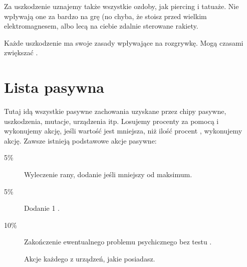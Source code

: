 Za uszkodzenie uznajemy także wszystkie ozdoby, jak piercing i tatuaże.
Nie wpływają one za bardzo na grę (no chyba, że stoisz przed wielkim elektromagnesem, albo lecą na ciebie zdalnie sterowane rakiety.

Każde uszkodzenie ma swoje zasady wpływające na rozgrywkę.
Mogą czasami zwiększać \abnkp{}.

\section{Lista pasywna}
Tutaj idą wszystkie pasywne zachowania uzyskane przez chipy pasywne, uszkodzenia, mutacje, urządzenia itp.
Losujemy procenty za pomocą \dc{} i wykonujemy akcję, jeśli wartość jest mniejsza, niż ilość procent , wykonujemy akcję.
Zawsze istnieją podstawowe akcje pasywne:
\begin{description}
\item[5\%] Wyleczenie rany, dodanie \abzyc{} jeśli mniejszy od maksimum.
\item[5\%] Dodanie 1 \abkar{}.
\item[10\%] Zakończenie ewentualnego problemu psychicznego bez testu \abh{}.
\item[] Akcje każdego z urządzeń, jakie posiadasz.
\end{description}





